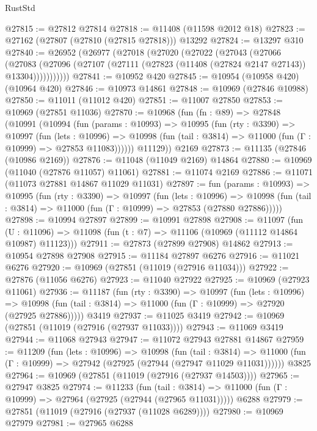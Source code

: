 \begin{lexlean}{RustStd}
\begin{coremodule}
@27815 := @27812 @27814
@27818 := @11408 (@11598 @2012 @18)
@27823 := @27162 (@27807 (@27810 (@27815 @27818))) @13292
@27824 := @13297 @310
@27840 := @26952
    (@26977
      (@27018
        (@27020
          (@27022
            (@27043
              (@27066
                (@27083
                  (@27096 (@27107 (@27111 (@27823 (@11408 (@27824 @2147 @27143)) @13304)))))))))))
@27841 := @10952 @420
@27845 := @10954 (@10958 @420) (@10964 @420)
@27846 := @10973 @14861
@27848 := @10969 (@27846 @10988)
@27850 := @11011 (@11012 @420)
@27851 := @11007 @27850
@27853 := @10969 (@27851 @11036)
@27870 := @10968
    (fun (fn : @89) =>
    @27848
      (@10991
        (@10994
          (fun (params : @10993) =>
          @10995
            (fun (rty : @3390) =>
            @10997
              (fun (lets : @10996) =>
              @10998 (fun (tail : @3814) => @11000 (fun (Γ : @10999) => @27853 @11083))))))
        @11129))
    @2169
@27873 := @11135 (@27846 (@10986 @2169))
@27876 := @11048 (@11049 @2169) @14864
@27880 := @10969 (@11040 (@27876 @11057) @11061)
@27881 := @11074 @2169
@27886 := @11071 (@11073 @27881 @14867 @11029 @11031)
@27897 := fun (params : @10993) =>
  @10995
    (fun (rty : @3390) =>
    @10997
      (fun (lets : @10996) =>
      @10998 (fun (tail : @3814) => @11000 (fun (Γ : @10999) => @27853 (@27880 @27886)))))
@27898 := @10994 @27897
@27899 := @10991 @27898
@27908 := @11097
    (fun (U : @11096) => @11098 (fun (t : @7) => @11106 (@10969 (@11112 @14864 @10987) @11123)))
@27911 := @27873 (@27899 @27908) @14862
@27913 := @10954 @27898 @27908
@27915 := @11184 @27897 @6276
@27916 := @11021 @6276
@27920 := @10969 (@27851 (@11019 (@27916 @11034)))
@27922 := @27876 (@11056 @6276)
@27923 := @11040 @27922
@27925 := @10969 (@27923 @11061)
@27936 := @11187
    (fun (rty : @3390) =>
    @10997
      (fun (lets : @10996) =>
      @10998 (fun (tail : @3814) => @11000 (fun (Γ : @10999) => @27920 (@27925 @27886)))))
    @3419
@27937 := @11025 @3419
@27942 := @10969 (@27851 (@11019 (@27916 (@27937 @11033))))
@27943 := @11069 @3419
@27944 := @11068 @27943
@27947 := @11072 @27943 @27881 @14867
@27959 := @11209
    (fun (lets : @10996) =>
    @10998
      (fun (tail : @3814) =>
      @11000 (fun (Γ : @10999) => @27942 (@27925 (@27944 (@27947 @11029 @11031))))))
    @3825
@27964 := @10969 (@27851 (@11019 (@27916 (@27937 @14503))))
@27965 := @27947 @3825
@27974 := @11233
    (fun (tail : @3814) => @11000 (fun (Γ : @10999) => @27964 (@27925 (@27944 (@27965 @11031)))))
    @6288
@27979 := @27851 (@11019 (@27916 (@27937 (@11028 @6289))))
@27980 := @10969 @27979
@27981 := @27965 @6288

\end{coremodule}
\end{lexlean}
